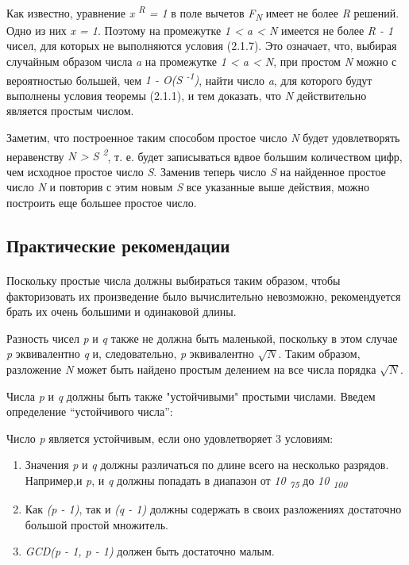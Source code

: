Как известно, уравнение \textit{x\textsuperscript{ R} = 1} в поле вычетов \textit{F\textsubscript{N}} имеет не более \textit{R} решений. 
Одно из них \textit{x = 1}. Поэтому на промежутке \textit{1 < a < N} имеется не более \textit{R - 1} чисел, для которых не выполняются 
условия (2.1.7). Это означает, что, выбирая случайным образом числа \textit{a} на промежутке \textit{1 < a < N}, при простом \textit{N}
можно с вероятностью большей, чем \textit{1 - O(S\textsuperscript{ -1})}, найти число \textit{a}, для которого будут выполнены условия 
теоремы (2.1.1), и тем доказать, что \textit{N} действительно является простым числом.

  Заметим, что построенное таким способом простое число \textit{N} будет удовлетворять неравенству \textit{N > S\textsuperscript{ 2}}, 
т. е. будет записываться вдвое большим количеством цифр, чем исходное простое число \textit{S}. Заменив теперь число \textit{S} на 
найденное простое число \textit{N} и повторив с этим новым \textit{S} все указанные выше действия, можно построить еще большее простое 
число.

\subsection{Практические рекомендации}

\paragraph{} Поскольку простые числа должны выбираться таким образом, чтобы факторизовать их произведение было вычислительно невозможно, 
рекомендуется брать их очень большими и одинаковой длины.

  Разность чисел \textit{p} и \textit{q} также не должна быть маленькой, поскольку в этом случае \textit{p} эквивалентно \textit{q} и,
следовательно, \textit{p} эквивалентно \textit{{$\sqrt{N}$}}. Таким образом, разложение \textit{N} может быть найдено простым делением 
на все числа порядка \textit{{$\sqrt{N}$}}.

  Числа \textit{p} и \textit{q} должны быть также "устойчивыми" простыми числами. Введем определение “устойчивого числа”:
  
    \begin{definition}   

      Число \textit{p} является устойчивым, если оно удовлетворяет 3 условиям:
	\begin{enumerate}
	 \item Значения \textit{p} и \textit{q} должны различаться по длине всего на несколько разрядов. Например,и \textit{p}, 
и \textit{q} должны попадать в диапазон от \textit{10\textsubscript{ 75}} до \textit{10\textsubscript{ 100}}
	 \item Как \textit{(p - 1)}, так и \textit{(q - 1)} должны содержать в своих разложениях достаточно большой простой множитель.
	 \item \textit{GCD(p - 1, p - 1)} должен быть достаточно малым.
	\end{enumerate}

    \end{definition}

